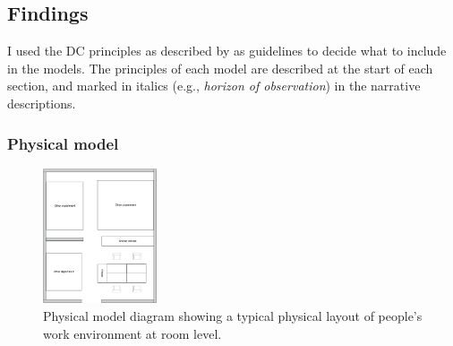 %
%
%


\subsection{Findings}
I used the DC principles as described by \citep{Furniss2006} as guidelines to decide what to include in the models. The principles of each model are described at the start of each section, and marked in italics (e.g., \textit{horizon of observation}) in the narrative descriptions.

\subsubsection{Physical model}
\begin{figure}[!ht]
\centering
\includegraphics[width=0.3\textwidth]{images/ch12/ch12_physmodroom.pdf}
\caption[Study 2 Room model]{Physical model diagram showing a typical physical layout of people's work environment at room level.}
\vspace{-9pt}
\label{fig:ch12_physmodroom}
\end{figure}

